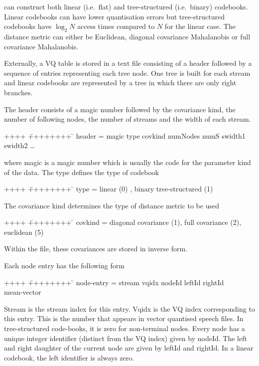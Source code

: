  can construct both linear (i.e.\ flat) and tree-structured
(i.e.\ binary) codebooks.  Linear codebooks can have lower quantisation
errors but tree-structured codebooks have $\log_2 N$ access times
compared to $N$ for the linear case.  The distance metric can either be
Euclidean, diagonal covariance Mahalanobis or full covariance
Mahalanobis.


Externally, a VQ table is stored in a text file consisting of a header
followed by a sequence of entries representing each tree node.  One tree
is built for each stream and linear codebooks are represented by a tree
in which there are only right branches.

The header consists of a magic number followed by the covariance kind,
the number of following nodes, the number of streams and the width
of each stream.
{\sf
\begin{tabbing}
++++ \= ++++++++ \=  \kill
\>  header =\> magic type covkind numNodes numS swidth1 swidth2  \ldots
\end{tabbing}
}
\noindent
where {\sf magic} is a magic number which is usually the
code for the parameter kind of the data.  The {\sf type}
defines the type of codebook
{\sf
\begin{tabbing}
++++ \= ++++++++ \=  \kill
\>  type =\> linear (0) , binary tree-structured (1)
\end{tabbing}
}
\noindent
The covariance kind determines the type of distance metric to be
used
{\sf
\begin{tabbing}
++++ \= ++++++++ \=  \kill
\>  covkind =\> diagonal covariance (1), full covariance (2), euclidean (5)
\end{tabbing}
}
\noindent
Within the file, these covariances are stored in inverse form.

Each node entry has the following form
{\sf
\begin{tabbing}
++++ \= ++++++++ \=  \kill
\>  node-entry =\> stream vqidx nodeId leftId rightId \\
\> \> mean-vector \\
\> 
\end{tabbing}
}
\noindent
{\sf Stream} is the stream index for this entry. {\sf Vqidx}
is the VQ index corresponding to this entry.  This is the number that
appears in vector quantised speech files.  In tree-structured code-books,
it is zero for non-terminal nodes. Every node has a unique
integer identifier (distinct from the VQ index) given by {\sf nodeId}.
The left and right daughter of the current node are given by
{\sf leftId} and {\sf rightId}.  In a linear codebook, the left identifier
is always zero.

